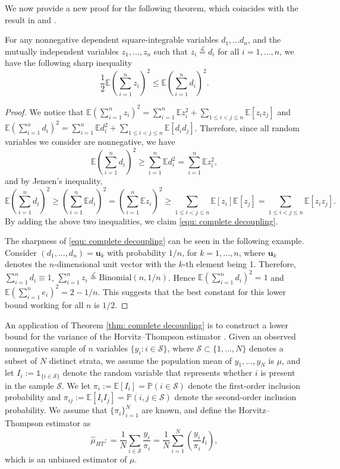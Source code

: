 \documentclass[ECP]{ejpecp} %
\newcommand{\lpar}{\left(}
\newcommand{\rpar}{\right)}
\newcommand{\pro}{\mathbb{P}}
\newcommand{\E}{\mathbb{E}}
\newcommand{\one}{\mathds{1}}
\newcommand{\sumn}{\sum\limits_{i=1}^n}
\begin{document}
We now provide a new proof for the following theorem, which coincides with the result in \cite{de1990bounds} and \cite{makarychev2018solving}.
\begin{theorem}
    \label{thm: complete decoupling}
    For any nonnegative dependent square-integrable  variables $d_1,...d_n$, and the mutually independent  variables $z_1,...,z_n$ such that $z_i \stackrel{\mathcal{L}}{=} d_i$ for all $i=1,...,n$, we have the following sharp inequality
    \begin{equation}
        \label{equ: complete decoupling}
        \frac{1}{2}\E\lpar\sumn z_i\rpar^2 \leq \E \lpar \sumn d_i\rpar^2.
    \end{equation}
\end{theorem}
\begin{proof}
     We notice that $\E (\sumn z_i) ^2 =  \sumn \E z_i^2 + \sum\limits_{1\leq i<j\leq n} \E [z_i z_j] $ and $\E (\sumn d_i) ^2 =  \sumn \E d_i^2 + \sum\limits_{1\leq i<j\leq n} \E [d_i d_j]$. Therefore, since all random variables we consider are nonnegative, we have 
     \[ \E (\sumn d_i) ^2 \geq \sumn \E d_i^2 =\sumn \E z_i^2, \]
    and by Jensen's inequality, 
    \[ \E (\sumn d_i) ^2  \geq (\sumn \E d_i)^2 =(\sumn \E z_i)^2 \geq \sum\limits_{1\leq i<j\leq n} \E [z_i]\E[z_j]  =\sum\limits_{1\leq i<j\leq n}  \E [z_i z_j] . \]
    By adding the above two inequalities, we claim \eqref{equ: complete decoupling}. 
    
    The sharpness of \eqref{equ: complete decoupling} can be seen in the following example. Consider $(d_1,...,d_n) = \boldsymbol{u}_k$ with probability $1/n$, for $k=1,...,n$, where $\boldsymbol{u}_k$ denotes the $n$-dimensional unit vector with the $k$-th element being 1. Therefore, $\sumn d_i \equiv 1$, $\sumn z_i \stackrel{\mathcal{L}}{=} \text{Binomial}(n,1/n)$. Hence $\E (\sumn d_i)^2 =1$ and $\E (\sumn e_i)^2 =2-1/n$. This suggests that the best constant for this lower bound working for all $n$ is $1/2$. 
\end{proof}

An application of Theorem \ref{thm: complete decoupling} is to construct a lower bound for the variance of the Horvitz–Thompson estimator \cite{MR53460}. Given an observed nonnegative sample of $n$ variables $\{y_i:i\in \mathcal S\}$, where $\mathcal S \subset \{1,...,N\}$ denotes a subset of $N$ distinct strata, we assume the population mean of  $y_1,...,y_N$ is $\mu$, and let $I_i:= \one_{\{i \in \mathcal S\}}$ denote the random variable that represents whether $i$ is present in the sample $\mathcal S$. We let $\pi_i:= \E [I_i] = \pro (i\in \mathcal S)$ denote the first-order inclusion probability and $\pi_{ij}:= \E [I_i I_j ] = \pro (i,j\in \mathcal S)$ denote the second-order inclusion probability. We assume that $\{\pi_i\}_{i=1}^N$ are known, and define the Horvitz–Thompson estimator as \[\hat \mu_{HT}: =\frac{1}{N} \sum_{i\in \mathcal S} \frac{y_i}{\pi_i} = \frac{1}{N} \sum\limits_{i=1}^N \lpar \frac{y_i}{\pi_i} I_i \rpar,\] which is an unbiased estimator of $\mu$. 
\end{document}
